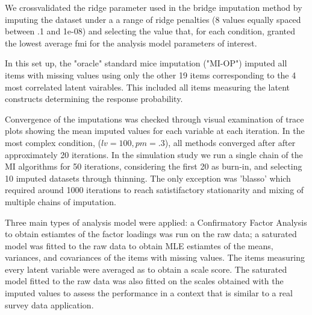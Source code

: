 We crossvalidated the ridge parameter used in the bridge imputation method by imputing the dataset under a 
a range of ridge penalties (8 values equally spaced between .1 and 1e-08) and selecting the value that, 
for each condition, granted the lowest average fmi for the analysis model parameters of interest.

In this set up, the "oracle" standard mice imputation ("MI-OP") imputed all items with missing values using only 
the other 19 items corresponding to the 4 most correlated latent vairables. This included all items measuring the 
latent constructs determining the response probability.

Convergence of the imputations was checked through visual examination of trace plots showing the mean imputed values
for each variable at each iteration. In the most complex condition, ($lv = 100, pm = .3$), all methods converged after 
after approximately 20 iterations. In the simulation study we run a single chain of the MI algorithms for 50 
iterations, considering the first 20 as burn-in, and selecting 10 imputed datasets through thinning.
The only exception was 'blasso' which required around 1000 iterations to reach satistifactory stationarity and mixing
of multiple chains of imputation.

Three main types of analysis model were applied: a Confirmatory Factor Analysis to obtain estiamtes of 
the factor loadings was run on the raw data; a saturated model was fitted to the raw data to obtain MLE 
estiamtes of the means, variances, and covariances of the items with missing values. The items measuring
every latent variable were averaged as to obtain a scale score. The saturated model fitted to the raw
data was also fitted on the scales obtained with the imputed values to assess the performance in a context
that is similar to a real survey data application.
